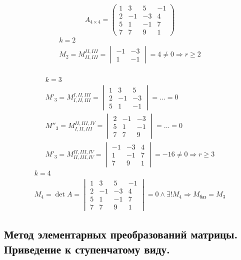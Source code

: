 \documentclass{article}
\begin{document}
\[
A_{4 \times 4} = \begin{pmatrix}
	1 & 3 & 5 & -1 \\
	2 & -1 & -3 & 4 \\
	5 & 1 & -1 & 7 \\
	7 & 7 & 9 & 1
\end{pmatrix}
\]
\begin{gather*}
	k = 2 \\
	M_2 = M_{II, III}^{II, III} = \begin{vmatrix}
		-1 & -3 \\
		1 & -1
	\end{vmatrix} = 4 \ne 0 \Rightarrow r \ge 2 \\
\end{gather*}

\begin{gather*}
	k = 3 \\
	M'_3 = M_{I, II, III}^{I, II, III} = \begin{vmatrix}
		1 & 3 & 5 \\
		2 & -1 & -3 \\
		5 & 1 & -1
	\end{vmatrix} = \dots = 0 \\
	M''_3 = M_{I, II, III}^{II, III, IV} = \begin{vmatrix}
		2 & -1 & -3 \\
		5 & 1 & -1 \\
		7 & 7 & 9
	\end{vmatrix} = \dots = 0 \\
	M'_3 = M_{II, III, IV}^{II, III, IV} = \begin{vmatrix}
		-1 & -3 & 4 \\
		1 & -1 & 7 \\
		7 & 9 & 1
	\end{vmatrix} = -16 \ne 0 \Rightarrow r \ge 3
\end{gather*}
\begin{gather*}
	k = 4 \\
	M_4 = \det A = \begin{vmatrix}
		1 & 3 & 5 & -1 \\
		2 & -1 & -3 & 4 \\
		5 & 1 & -1 & 7 \\
		7 & 7 & 9 & 1
	\end{vmatrix} = 0 \land \exists ! M_4 \Rightarrow M_\text{баз} = M_3
\end{gather*}

\subsection{Метод элементарных преобразований матрицы. \\
Приведение к ступенчатому виду.}
\end{document}
